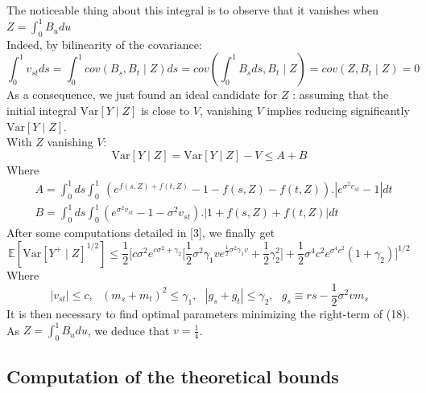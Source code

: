 \documentclass{article}
\begin{document}
The noticeable thing about this integral is to observe that it vanishes when $Z=\int_{0}^{1}B_u du$\\
Indeed, by bilinearity of the covariance:\\
\begin{equation}
    \int_{0}^{1}v_{st}ds=\int_{0}^{1}cov(B_s,B_t\mid Z)ds=cov(\int_{0}^{1}B_s ds,B_t\mid Z)=cov(Z,B_t\mid Z)=0
\end{equation}
As a consequence, we just found an ideal candidate for $Z$ : assuming that the initial integral $\mathrm{Var}[Y\mid Z]$ is close to $V$, vanishing $V$ implies reducing significantly $\mathrm{Var}[Y\mid Z]$.\\
With $Z$ vanishing $V$:
\begin{equation}
  \mathrm{Var}[Y\mid Z]= \mathrm{Var}[Y\mid Z]-V\leq A+B 
\end{equation}
Where 
\begin{equation}
    \begin{aligned}
    &A=\int_{0}^{1}d s\int_{0}^{1}\ (e^{f(s,Z)+f(t,Z)}-1-f(s,Z)-f(t,Z)).|e^{\sigma^{2}v_{s t}}-1|d t\\
    &B=\int_{0}^{1}d s\int_{0}^{1}(e^{\sigma^{2}v_{s t}}-1-\sigma^{2}v_{s t}).|1+f(s,Z)+f(t,Z)|d t
    \end{aligned}
\end{equation}
After some computations detailed in [3], we finally get
\begin{equation}
    \mathbb{E}[\mathrm{Var}[Y^{+}\mid Z]^{1/2}] \leq \frac{1}{2}\Biggl[c\sigma^{2}e^{c\sigma^{2}+\gamma_{2}}\biggl[\frac{1}{2}\sigma^{2}\gamma_{1}v e^{{\frac{1}{2}}\sigma^{2}\gamma_{1}v}+{\textstyle{\frac{1}{2}}}\gamma_{2}^{2}\biggr]+{\textstyle{\frac{1}{2}}}\sigma^{4}c^{2}e^{\sigma^{4}c^{2}}(1+\gamma_{2})\Biggr]^{1/2}
\end{equation}
Where 
\begin{equation}
    |v_{s t}|\leq c,\ \ \ (m_{s}+m_{t})^{2}\leq\gamma_{1},\ \ \ |g_{s}+g_{t}|\leq\gamma_{2} ,\ \ \ 
    g_s\equiv r s-\textstyle{\frac{1}{2}}\sigma^{2}v m_{s}
\end{equation}
It is then necessary to find optimal parameters minimizing the right-term of (18). \\
As $Z=\int_{0}^{1}B_u du$, we deduce that $v=\frac{1}{4}$.

\subsection{Computation of the theoretical bounds}
\end{document}
